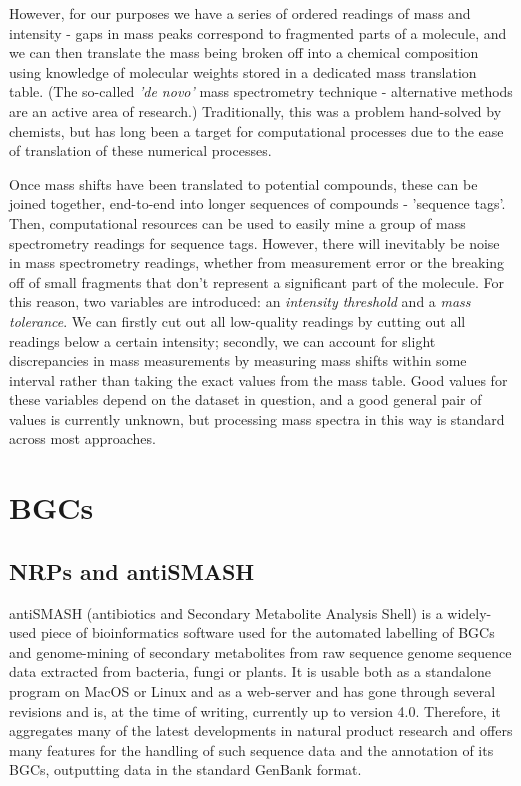 \documentclass{l4proj}
\newcommand{\cit}[1]{\citep{#1}}
\begin{document}
However, for our purposes we have a series of ordered readings of mass and intensity - gaps in mass peaks correspond to fragmented parts of a molecule, and we can then translate the mass being broken off into a chemical composition using knowledge of molecular weights stored in a dedicated mass translation table. (The so-called \textit{'de novo'} mass spectrometry technique - alternative methods are an active area of research.) Traditionally, this was a problem hand-solved by chemists, but has long been a target for computational processes due to the ease of translation of these numerical processes. 

Once mass shifts have been translated to potential compounds, these can be joined together, end-to-end into longer sequences of compounds - 'sequence tags'. Then, computational resources can be used to easily mine a group of mass spectrometry readings for sequence tags. However, there will inevitably be noise in mass spectrometry readings, whether from measurement error or the breaking off of small fragments that don't represent a significant part of the molecule. For this reason, two variables are introduced: an \textit{intensity threshold} and a \textit{mass tolerance}. We can firstly cut out all low-quality readings by cutting out all readings below a certain intensity; secondly, we can account for slight discrepancies in mass measurements by measuring mass shifts within some interval rather than taking the exact values from the mass table. Good values for these variables depend on the dataset in question, and a good general pair of values is currently unknown, but processing mass spectra in this way is standard across most approaches.

\section{BGCs}

\subsection{NRPs and antiSMASH}

antiSMASH (antibiotics and Secondary Metabolite Analysis Shell) \cit{as4} is a widely-used piece of bioinformatics software used for the automated labelling of BGCs and genome-mining of secondary metabolites from raw sequence genome sequence data extracted from bacteria, fungi or plants. It is usable both as a standalone program on MacOS or Linux and as a web-server and has gone through several revisions and is, at the time of writing, currently up to version 4.0. Therefore, it aggregates many of the latest developments in natural product research and offers many features for the handling of such sequence data and the annotation of its BGCs, outputting data in the standard GenBank format.
\end{document}
